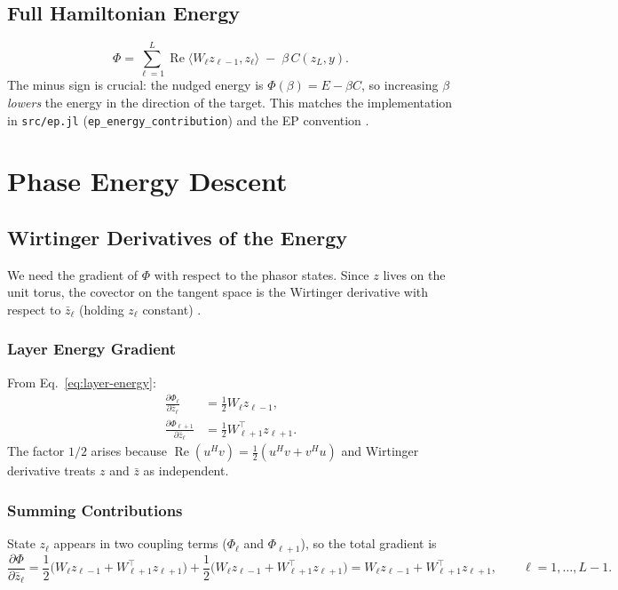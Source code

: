 \documentclass[11pt]{article}
\DeclareMathOperator{\Real}{Re}
\begin{document}
\subsection{Full Hamiltonian Energy}

\begin{equation}\label{eq:full-energy}
\Phi = \sum_{\ell=1}^L \Real\langle W_\ell z_{\ell-1}, z_\ell \rangle \;-\; \beta\, C(z_L, y).
\end{equation}
The minus sign is crucial: the nudged energy is $\Phi(\beta) = E - \beta C$, so increasing $\beta$ \emph{lowers} the energy in the direction of the target. This matches the implementation in \texttt{src/ep.jl} (\texttt{ep\_energy\_contribution}) and the EP convention \citep{scellier2017equilibrium}.

\section{Phase Energy Descent}\label{sec:energy-descent}

\subsection{Wirtinger Derivatives of the Energy}\label{ssec:wirtinger}

We need the gradient of $\Phi$ with respect to the phasor states. Since $z$ lives on the unit torus, the covector on the tangent space is the Wirtinger derivative with respect to $\bar{z}_\ell$ (holding $z_\ell$ constant) \citep{laborieux2022holomorphic}.

\subsubsection{Layer Energy Gradient}
From Eq.~\ref{eq:layer-energy}:
\begin{align}
\frac{\partial \Phi_\ell}{\partial \bar{z}_\ell}
&= \frac{1}{2} W_\ell z_{\ell-1}, \\
\frac{\partial \Phi_{\ell+1}}{\partial \bar{z}_\ell}
&= \frac{1}{2} W_{\ell+1}^\top z_{\ell+1}.
\end{align}
The factor $1/2$ arises because $\Real(u^H v) = \frac{1}{2}(u^H v + v^H u)$ and Wirtinger derivative treats $z$ and $\bar{z}$ as independent.

\subsubsection{Summing Contributions}
State $z_\ell$ appears in two coupling terms ($\Phi_\ell$ and $\Phi_{\ell+1}$), so the total gradient is
\begin{equation}
\frac{\partial \Phi}{\partial \bar{z}_\ell}
= \frac{1}{2}\big( W_\ell z_{\ell-1} + W_{\ell+1}^\top z_{\ell+1} \big)
+ \frac{1}{2}\big( W_\ell z_{\ell-1} + W_{\ell+1}^\top z_{\ell+1} \big)
= W_\ell z_{\ell-1} + W_{\ell+1}^\top z_{\ell+1},
\qquad \ell = 1,\dots,L-1.
\end{equation}
\end{document}
